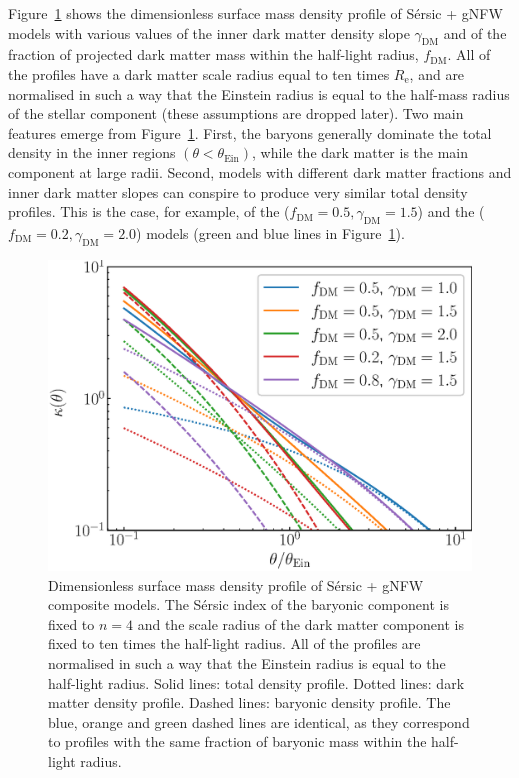 \documentclass{aa}
\def\reff{R_{\mathrm{e}}}
\def\gammadm{\gamma_{\mathrm{DM}}}
\def\fdm{f_{\mathrm{DM}}}
\def\tein{\theta_{\mathrm{Ein}}}
\def\Fref#1{Figure~\ref{#1}\xspace}
\begin{document}
\Fref{fig:kappa} shows the dimensionless surface mass density profile of S\'{e}rsic + gNFW models with various values of the inner dark matter density slope $\gammadm$ and of the fraction of projected dark matter mass within the half-light radius, $\fdm$.
All of the profiles have %
a dark matter scale radius equal to ten times $\reff$, and are normalised in such a way that the Einstein radius is equal to the half-mass radius of the stellar component (these assumptions are dropped later).
Two main features emerge from \Fref{fig:kappa}. First, the baryons generally dominate the total density in the inner regions $(\theta < \tein)$, while the dark matter is the main component at large radii.
Second, models with different dark matter fractions and inner dark matter slopes can conspire to produce very similar total density profiles. 
This is the case, for example, of the ($\fdm=0.5,\gammadm=1.5$) and the ($\fdm=0.2,\gammadm=2.0$) models (green and blue lines in \Fref{fig:kappa}).

%
\begin{figure}
\includegraphics[width=\columnwidth]{composite_fixedap_kappa.eps}
\caption{
Dimensionless surface mass density profile of S\'{e}rsic + gNFW composite models.
The S\'{e}rsic index of the baryonic component is fixed to $n=4$ and the scale radius of the dark matter component is fixed to ten times the half-light radius.
All of the profiles are normalised in such a way that the Einstein radius is equal to the half-light radius.
Solid lines: total density profile. Dotted lines: dark matter density profile. Dashed lines: baryonic density profile.
The blue, orange and green dashed lines are identical, as they correspond to profiles with the same fraction of baryonic mass within the half-light radius.
\label{fig:kappa}
}
\end{figure}
%
\end{document}
